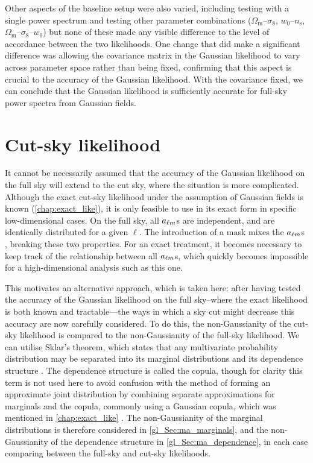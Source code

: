 Other aspects of the baseline setup were also varied, including testing with a single power spectrum and testing other parameter combinations ($\Omega_\text{m}$--$\sigma_8$, $w_0$--$n_\text{s}$, $\Omega_\text{m}$--$\sigma_8$--$w_0$) but none of these made any visible difference to the level of accordance between the two likelihoods. One change that did make a significant difference was allowing the covariance matrix in the Gaussian likelihood to vary across parameter space rather than being fixed, confirming that this aspect is crucial to the accuracy of the Gaussian likelihood. With the covariance fixed, we can conclude that the Gaussian likelihood is sufficiently accurate for full-sky power spectra from Gaussian fields.

\section{Cut-sky likelihood}
\label{gl_Sec:cut_sky}

It cannot be necessarily assumed that the accuracy of the Gaussian likelihood on the full sky will extend to the cut sky, where the situation is more complicated. Although the exact cut-sky likelihood under the assumption of Gaussian fields is known (\autoref{chap:exact_like}), it is only feasible to use in its exact form in specific low-dimensional cases.
On the full sky, all $a_{\ell m}$s are independent, and are identically distributed for a given $\ell$. The introduction of a mask mixes the $a_{\ell m}$s \citep{Lewis2001, Brown2005}, breaking these two properties. For an exact treatment, it becomes necessary to keep track of the relationship between all $a_{\ell m}$s, which quickly becomes impossible for a high-dimensional analysis such as this one.

This motivates an alternative approach, which is taken here: after having tested the accuracy of the Gaussian likelihood on the full sky--where the exact likelihood is both known and tractable---the ways in which a sky cut might decrease this accuracy are now carefully considered.
To do this, the non-Gaussianity of the cut-sky likelihood is compared to the non-Gaussianity of the full-sky likelihood.
We can utilise Sklar's theorem, which states that any multivariate probability distribution may be separated into its marginal distributions and its dependence structure \citep{Sklar1959}.
The dependence structure is called the copula, though for clarity this term is not used here to avoid confusion with the method of forming an approximate joint distribution by combining separate approximations for marginals and the copula, commonly using a Gaussian copula, which was mentioned in \autoref{chap:exact_like} \citep[see][for more discussion of this method in a cosmological context]{Benabed2009, Sato2010, Sato2011}. The non-Gaussianity of the marginal distributions is therefore considered in \autoref{gl_Sec:ma_marginals}, and the non-Gaussianity of the dependence structure in \autoref{gl_Sec:ma_dependence}, in each case comparing between the full-sky and cut-sky likelihoods.

